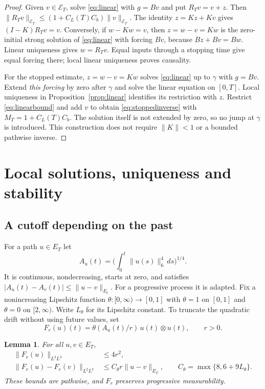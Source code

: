 \documentclass[11pt]{article}
\newtheorem{lemma}[theorem]{Lemma}
\numberwithin{equation}{section}
\begin{document}
\begin{proof}
Given $v\in\mathcal E_T$, solve \eqref{eq:linear} with $g=Bv$ and put
$R_Tv=v+z$. Then
$\|R_Tv\|_{\mathcal E_T}\leq(1+C_L(T)C_b)\|v\|_{\mathcal E_T}$.
The identity $z=Kz+Kv$ gives $(I-K)R_Tv=v$.
Conversely, if $w-Kw=v$, then $z=w-v=Kw$ is the zero-initial strong solution
of \eqref{eq:linear} with forcing $Bv$, because $Bz+Bv=Bw$.
Linear uniqueness gives $w=R_Tv$. Equal inputs through a stopping time give
equal forcing there; local linear uniqueness proves causality.

For the stopped estimate, $z=w-v=Kw$ solves \eqref{eq:linear} up to
$\gamma$ with $g=Bv$. Extend \emph{this forcing} by zero after $\gamma$
and solve the linear equation on $[0,T]$. Local uniqueness in
Proposition~\ref{prop:linear} identifies its restriction with $z$.
Restrict \eqref{eq:linearbound} and add $v$ to obtain
\eqref{eq:stoppedinverse} with $M_T=1+C_L(T)C_b$.
The solution itself is not extended by zero, so no jump at $\gamma$ is
introduced. This construction does not require $\|K\|<1$ or a bounded
pathwise inverse.
\end{proof}

\section{Local solutions, uniqueness and stability}\label{sec:proof}

\subsection{A cutoff depending on the past}
For a path $u\in E_T$ let
\[
 A_u(t)=\Big(\int_0^t\|u(s)\|_6^4\,ds\Big)^{1/4}.
\]
It is continuous, nondecreasing, starts at zero, and satisfies
$|A_u(t)-A_v(t)|\leq\|u-v\|_{E_t}$. For a progressive process it is
adapted. Fix a nonincreasing Lipschitz function $\theta:[0,\infty)\to[0,1]$
with $\theta=1$ on $[0,1]$ and $\theta=0$ on $[2,\infty)$. Write
$L_\theta$ for its Lipschitz constant. To truncate the quadratic drift
without using future values, set
\[
 F_r(u)(t)=\theta(A_u(t)/r)\,u(t)\otimes u(t),\qquad r>0.
\]

\begin{lemma}\label{lem:cutoff}
For all $u,v\in E_T$,
\begin{align}
 \|F_r(u)\|_{L^2L^3}&\leq4r^2,\label{eq:cutoffbound}\\
 \|F_r(u)-F_r(v)\|_{L^2L^3}
 &\leq C_\theta r\|u-v\|_{E_T},
 \qquad C_\theta=\max\{8,6+9L_\theta\}.\label{eq:cutofflip}
\end{align}
These bounds are pathwise, and $F_r$ preserves progressive measurability.
\end{lemma}
\end{document}
